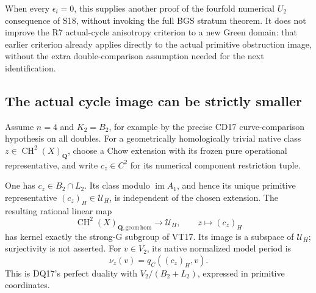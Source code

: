 When every $\epsilon_i=0$, this supplies another proof of the
fourfold numerical $U_2$ consequence of S18, without invoking the
full BGS stratum theorem.  It does not improve the R7 actual-cycle
anisotropy criterion to a new Green domain: that earlier criterion
already applies directly to the actual primitive obstruction
image, without the extra double-comparison assumption needed
for the next identification.

\subsection{The actual cycle image can be strictly smaller}

Assume $n=4$ and $K_2=B_2$, for example by the precise CD17
curve-comparison hypothesis on all doubles.  For a geometrically
homologically trivial native class $z\in\operatorname{CH}^2(X)_{\mathbf Q}$,
choose a Chow extension with its frozen pure operational
representative, and write $c_z\in C^2$ for its numerical
component restriction tuple.

\begin{proposition}
\label{r18pu:period-image}
One has $c_z\in B_2\cap L_2$.  Its class modulo
$\operatorname{im}A_1$, and hence its unique primitive
representative $(c_z)_H\in\mathscr U_H$, is independent of the
chosen extension.  The resulting rational linear map
\[
 \operatorname{CH}^2(X)_{\mathbf Q,\mathrm{geom\,hom}}
              \longrightarrow \mathscr U_H,\qquad z\longmapsto(c_z)_H
 \tag{PU18.16}\label{r18pu:cycle-map}
\]
has kernel exactly the strong-G subgroup of VT17.  Its image
is a subspace of $\mathscr U_H$; surjectivity is not asserted.
For $v\in V_2$, its native normalized model period is
\[
                      \nu_z(v)=q_C((c_z)_H,v).
 \tag{PU18.17}\label{r18pu:period-formula}
\]
This is DQ17's perfect duality with
$V_2/(B_2+L_2)$, expressed in primitive coordinates.
\end{proposition}

